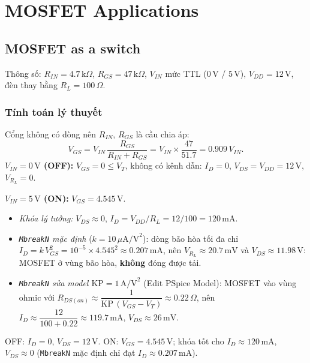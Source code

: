 \section{MOSFET Applications}\label{sec:app}

\subsection{MOSFET as a switch}\label{sec:switch}

Thông số: $R_{IN} = 4.7\,\text{k}\Omega$, $R_{GS} = 47\,\text{k}\Omega$, $V_{IN}$ mức TTL ($0\,\text{V}$ / $5\,\text{V}$), $V_{DD} = 12\,\text{V}$, đèn thay bằng $R_L = 100\,\Omega$.

\subsubsection*{Tính toán lý thuyết}
Cổng không có dòng nên $R_{IN}$, $R_{GS}$ là cầu chia áp:
\[
V_{GS} = V_{IN}\,\frac{R_{GS}}{R_{IN} + R_{GS}} = V_{IN} \times \frac{47}{51.7} = 0.909\,V_{IN}.
\]
\textbf{$V_{IN} = 0\,\text{V}$ (OFF):} $V_{GS} = 0 \le V_T$, không có kênh dẫn:
$I_D = 0$, $V_{DS} = V_{DD} = 12\,\text{V}$, $V_{R_L} = 0$.

\noindent\textbf{$V_{IN} = 5\,\text{V}$ (ON):} $V_{GS} = 4.545\,\text{V}$.
\begin{itemize}[nosep]
  \item \textit{Khóa lý tưởng:} $V_{DS} \approx 0$, $I_D = V_{DD}/R_L = 12/100 = 120\,\text{mA}$.
  \item \textit{\texttt{MbreakN} mặc định} ($k = 10\,\mu\text{A/V}^2$): dòng bão hòa tối đa chỉ
  $I_D = k\,V_{GS}^2 = 10^{-5} \times 4.545^2 \approx 0.207\,\text{mA}$, nên $V_{R_L} \approx 20.7\,\text{mV}$ và $V_{DS} \approx 11.98\,\text{V}$: MOSFET ở vùng bão hòa, \textbf{không} đóng được tải.
  \item \textit{\texttt{MbreakN} sửa model $\text{KP} = 1\,\text{A/V}^2$} (Edit PSpice Model): MOSFET vào vùng ohmic với
  $R_{DS(on)} \approx \dfrac{1}{\text{KP}\,(V_{GS} - V_T)} \approx 0.22\,\Omega$, nên
  $I_D \approx \dfrac{12}{100 + 0.22} \approx 119.7\,\text{mA}$, $V_{DS} \approx 26\,\text{mV}$.
\end{itemize}

\begin{dapsobox}
OFF: $I_D = 0$, $V_{DS} = 12\,\text{V}$. \quad
ON: $V_{GS} = 4.545\,\text{V}$; khóa tốt cho $I_D \approx 120\,\text{mA}$, $V_{DS} \approx 0$
(\texttt{MbreakN} mặc định chỉ đạt $I_D \approx 0.207\,\text{mA}$).
\end{dapsobox}

